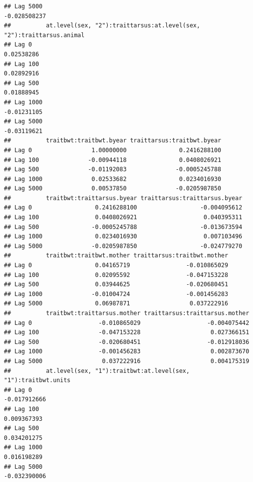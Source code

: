\documentclass[
  12pt,
]{book}
\begin{document}
\begin{verbatim}
## Lag 5000                                                      -0.028508237
##          at.level(sex, "2"):traittarsus:at.level(sex, "2"):traittarsus.animal
## Lag 0                                                              0.02538286
## Lag 100                                                            0.02892916
## Lag 500                                                            0.01888945
## Lag 1000                                                          -0.01231105
## Lag 5000                                                          -0.03119621
##          traitbwt:traitbwt.byear traittarsus:traitbwt.byear
## Lag 0                 1.00000000               0.2416288100
## Lag 100              -0.00944118               0.0408026921
## Lag 500              -0.01192083              -0.0005245788
## Lag 1000              0.02533682               0.0234016930
## Lag 5000              0.00537850              -0.0205987850
##          traitbwt:traittarsus.byear traittarsus:traittarsus.byear
## Lag 0                  0.2416288100                  -0.004095612
## Lag 100                0.0408026921                   0.040395311
## Lag 500               -0.0005245788                  -0.013673594
## Lag 1000               0.0234016930                   0.007103496
## Lag 5000              -0.0205987850                  -0.024779270
##          traitbwt:traitbwt.mother traittarsus:traitbwt.mother
## Lag 0                  0.04165719                -0.010865029
## Lag 100                0.02095592                -0.047153228
## Lag 500                0.03944625                -0.020680451
## Lag 1000              -0.01004724                -0.001456283
## Lag 5000               0.06987871                 0.037222916
##          traitbwt:traittarsus.mother traittarsus:traittarsus.mother
## Lag 0                   -0.010865029                   -0.004075442
## Lag 100                 -0.047153228                    0.027366151
## Lag 500                 -0.020680451                   -0.012918036
## Lag 1000                -0.001456283                    0.002873670
## Lag 5000                 0.037222916                    0.004175319
##          at.level(sex, "1"):traitbwt:at.level(sex, "1"):traitbwt.units
## Lag 0                                                     -0.017912666
## Lag 100                                                    0.009367393
## Lag 500                                                    0.034201275
## Lag 1000                                                   0.016198289
## Lag 5000                                                  -0.032390006

\end{verbatim}
\end{document}
